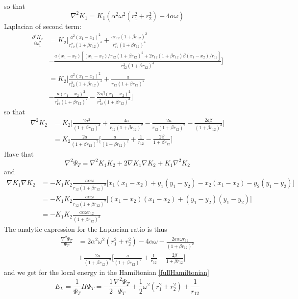 \documentclass[english, a4paper]{article}
\begin{document}
so that
\begin{equation}
 \nabla^2 K_1 = K_1 (\alpha^2 \omega^2 (r_1^2 + r_2^2) - 4\alpha \omega)
\end{equation}
Laplacian of second term:
\begin{align}
 \frac{\partial^2 K_2}{\partial x_1^2} &= K_2 \Biggr[\frac{a^2(x_1-x_2)^2}{r_{12}^2(1 + \beta r_{12})^4} +
 \frac{ar_{12}(1 + \beta r_{12})^2}{r_{12}^2(1 + \beta r_{12})^4} \\
 &-\frac{a(x_1 - x_2)[(x_1-x_2)/r_{12} (1 + \beta r_{12})^2 + 2r_{12}(1 + \beta r_{12})\beta(x_1-x_2)/r_{12}]}
 {r_{12}^2(1 + \beta r_{12})^4} \Biggr] \\
 &= K_2 \Biggr[\frac{a^2(x_1-x_2)^2}{r_{12}^2(1 + \beta r_{12})^4} +
 \frac{a}{r_{12}(1 + \beta r_{12})^2} \\
 &-\frac{a(x_1 - x_2)^2}{r_{12}^3(1 + \beta r_{12})^2}
 - \frac{2a\beta(x_1 - x_2)^2} {r_{12}^2(1 + \beta r_{12})^3} \Biggr]
\end{align}
so that
\begin{align}
 \nabla^2 K_2 &= K_2\Biggr[\frac{2a^2}{(1 + \beta r_{12})^4} + \frac{4a}{r_{12}(1 + \beta r_{12})^2}
              - \frac{2a}{r_{12}(1 + \beta r_{12})^2} - \frac{2a\beta}{(1 + \beta r_{12})^3} \Biggr] \\
              &= K_2\frac{2a}{(1+\beta r_{12})^2}\Biggr[ \frac{a}{(1+\beta r_{12})^2} + 
              \frac{1}{r_{12}} - \frac{2\beta}{1 + \beta r_{12}} \Biggr]
\end{align}
Have that
\begin{equation}
 \nabla^2 \Psi_T = \nabla^2K_1K_2 + 2\nabla K_1\nabla K_2 + K_1\nabla^2K_2
\end{equation}
and
\begin{align}
 \nabla K_1 \nabla K_2 &= -K_1K_2 \frac{a\alpha \omega}{r_{12}(1+\beta r_{12})^2}
 \Bigr[x_1(x_1 - x_2) + y_1(y_1 - y_2) - x_2(x_1 - x_2) - y_2(y_1 - y_2)\Bigr] \\
 &= -K_1K_2 \frac{a\alpha \omega}{r_{12}(1+\beta r_{12})^2}
 \Bigr[(x_1 - x_2)(x_1 - x_2) + (y_1 - y_2)(y_1 - y_2)\Bigr] \\
 &= -K_1K_2 \frac{a\alpha \omega r_{12}}{(1+\beta r_{12})^2}
\end{align}
The analytic expression for the Laplacian ratio is thus
\begin{align}
 \frac{\nabla^2\Psi_T}{\Psi_T} &= 2\alpha^2 \omega^2(r_1^2 + r_2^2) - 4\alpha \omega
 - \frac{2a\alpha \omega r_{12}}{(1+\beta r_{12})^2} \\
 &+ \frac{2a}{(1+\beta r_{12})^2}\Biggr[ \frac{a}{(1+\beta r_{12})^2} + 
              \frac{1}{r_{12}} - \frac{2\beta}{1 + \beta r_{12}} \Biggr]
              \label{analyticLocalEnergy}
\end{align}
and we get for the local energy in the Hamiltonian \eqref{fullHamiltonian}
\begin{equation}
 E_L = \frac{1}{\Psi_T}H\Psi_T = -\frac{1}{2}\frac{\nabla^2\Psi_T}{\Psi_T} + 
 \frac{1}{2}\omega^2(r_1^2 + r_2^2) + \frac{1}{r_{12}}
\end{equation}
\end{document}
